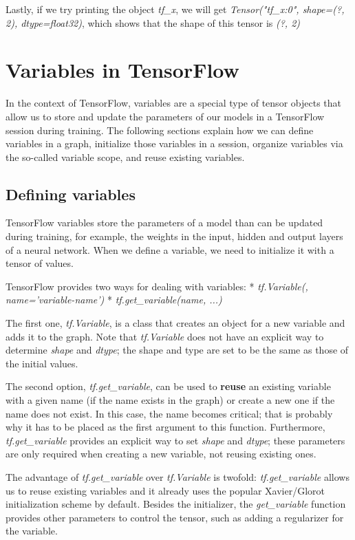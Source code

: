 \documentclass[11pt]{article}
\begin{document}
    Lastly, if we try printing the object \emph{tf\_x}, we will get
\emph{Tensor("tf\_x:0", shape=(?, 2), dtype=float32)}, which shows that
the shape of this tensor is \emph{(?, 2)}

    \section{Variables in TensorFlow}\label{variables-in-tensorflow}

    In the context of TensorFlow, variables are a special type of tensor
objects that allow us to store and update the parameters of our models
in a TensorFlow session during training. The following sections explain
how we can define variables in a graph, initialize those variables in a
session, organize variables via the so-called variable scope, and reuse
existing variables.

    \subsection{Defining variables}\label{defining-variables}

    TensorFlow variables store the parameters of a model than can be updated
during training, for example, the weights in the input, hidden and
output layers of a neural network. When we define a variable, we need to
initialize it with a tensor of values.

TensorFlow provides two ways for dealing with variables: *
\emph{tf.Variable(, name='variable-name')} *
\emph{tf.get\_variable(name, ...)}

The first one, \emph{tf.Variable}, is a class that creates an object for
a new variable and adds it to the graph. Note that \emph{tf.Variable}
does not have an explicit way to determine \emph{shape} and
\emph{dtype}; the shape and type are set to be the same as those of the
initial values.

The second option, \emph{tf.get\_variable}, can be used to
\textbf{reuse} an existing variable with a given name (if the name
exists in the graph) or create a new one if the name does not exist. In
this case, the name becomes critical; that is probably why it has to be
placed as the first argument to this function. Furthermore,
\emph{tf.get\_variable} provides an explicit way to set \emph{shape} and
\emph{dtype}; these parameters are only required when creating a new
variable, not reusing existing ones.

The advantage of \emph{tf.get\_variable} over \emph{tf.Variable} is
twofold: \emph{tf.get\_variable} allows us to reuse existing variables
and it already uses the popular Xavier/Glorot initialization scheme by
default. Besides the initializer, the \emph{get\_variable} function
provides other parameters to control the tensor, such as adding a
regularizer for the variable.
\end{document}
